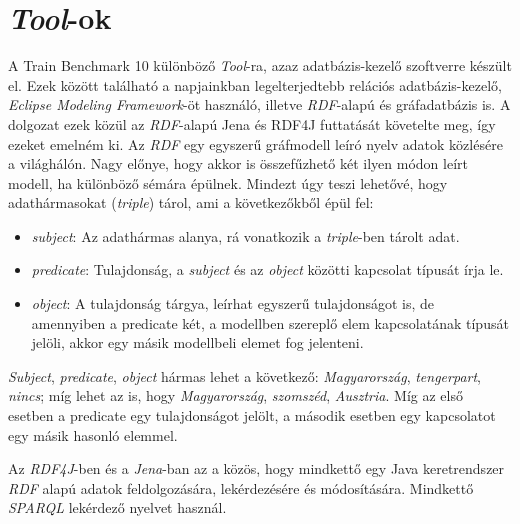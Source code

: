 \section{\emph{Tool}-ok}

A Train Benchmark 10 különböző \emph{Tool}-ra, azaz adatbázis-kezelő szoftverre készült el. Ezek között található a napjainkban legelterjedtebb relációs adatbázis-kezelő, \emph{Eclipse Modeling Framework}-öt használó, illetve \emph{RDF}-alapú és gráfadatbázis is. A dolgozat ezek közül az \emph{RDF}-alapú Jena és  RDF4J futtatását követelte meg, így ezeket emelném ki. Az \emph{RDF} egy egyszerű gráfmodell leíró nyelv adatok közlésére a világhálón. Nagy előnye, hogy akkor is összefűzhető két ilyen módon leírt modell, ha különböző sémára épülnek. Mindezt úgy teszi lehetővé, hogy adathármasokat (\emph{triple}) tárol, ami a következőkből épül fel:
\begin{itemize}
	\item \emph{subject}: Az adathármas alanya, rá vonatkozik a \emph{triple}-ben tárolt adat.
	\item \emph{predicate}: Tulajdonság, a \emph{subject} és az \emph{object} közötti kapcsolat típusát írja le.
	\item \emph{object}: A tulajdonság tárgya, leírhat egyszerű tulajdonságot is, de amennyiben a predicate két, a modellben szereplő elem kapcsolatának típusát jelöli, akkor egy másik modellbeli elemet fog jelenteni.
\end{itemize}

\emph{Subject}, \emph{predicate}, \emph{object} hármas lehet a következő: \emph{Magyarország}, \emph{tengerpart}, \emph{nincs}; míg lehet az is, hogy \emph{Magyarország}, \emph{szomszéd}, \emph{Ausztria}. Míg az első esetben a predicate egy tulajdonságot jelölt, a második esetben egy kapcsolatot egy másik hasonló elemmel.

Az \emph{RDF4J}-ben és a \emph{Jena}-ban az a közös, hogy mindkettő egy Java keretrendszer \emph{RDF} alapú adatok feldolgozására, lekérdezésére és módosítására. Mindkettő \emph{SPARQL} lekérdező nyelvet használ.